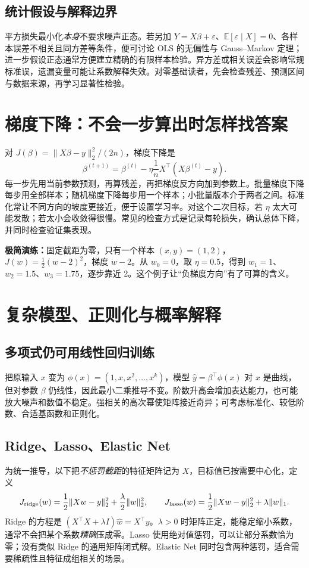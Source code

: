\documentclass[UTF8,11pt,oneside]{ctexbook}
\newcommand{\E}{\mathbb{E}}
\begin{document}
\section{统计假设与解释边界}
平方损失最小化\emph{本身}不要求噪声正态。若另加 $Y=X\beta+\varepsilon$、$\E[\varepsilon\mid X]=0$、各样本误差不相关且同方差等条件，便可讨论 OLS 的无偏性与 Gauss--Markov 定理；进一步假设正态通常方便建立精确的有限样本检验。异方差或相关误差会影响常规标准误，遗漏变量可能让系数解释失效。对零基础读者，先会检查残差、预测区间与数据来源，再学习显著性检验。

\chapter{梯度下降：不会一步算出时怎样找答案}
对 $J(\beta)=\|X\beta-y\|_2^2/(2n)$，梯度下降是
\[
\beta^{(t+1)}=\beta^{(t)}-\eta\frac1nX^\top(X\beta^{(t)}-y).
\]
每一步先用当前参数预测，再算残差，再把梯度反方向加到参数上。批量梯度下降每步用全部样本；随机梯度下降每步用一个样本；小批量版本介于两者之间。标准化常让不同方向的坡度更接近，便于设置学习率。对这个二次目标，若 $\eta$ 太大可能发散；若太小会收敛得很慢。常见的检查方式是记录每轮损失，确认总体下降，并同时检查验证集表现。

\textbf{极简演练：}固定截距为零，只有一个样本 $(x,y)=(1,2)$，$J(w)=\frac12(w-2)^2$，梯度 $w-2$。从 $w_0=0$，取 $\eta=0.5$，得到 $w_1=1$、$w_2=1.5$、$w_3=1.75$，逐步靠近 2。这个例子让“负梯度方向”有了可算的含义。

\chapter{复杂模型、正则化与概率解释}
\section{多项式仍可用线性回归训练}
把原输入 $x$ 变为 $\phi(x)=(1,x,x^2,\ldots,x^k)$，模型 $\hat y=\beta^\top\phi(x)$ 对 $x$ 是曲线，但对参数 $\beta$ 仍线性，因此最小二乘推导不变。阶数升高会增加表达能力，也可能放大噪声和数值不稳定。强相关的高次幂使矩阵接近奇异；可考虑标准化、较低阶数、合适基函数和正则化。

\section{Ridge、Lasso、Elastic Net}
为统一推导，以下把\emph{不惩罚截距}的特征矩阵记为 $X$，目标值已按需要中心化，定义
\[
J_{\rm ridge}(w)=\frac12\|Xw-y\|_2^2+\frac\lambda2\|w\|_2^2,
\qquad
J_{\rm lasso}(w)=\frac12\|Xw-y\|_2^2+\lambda\|w\|_1.
\]
Ridge 的方程是 $(X^\top X+\lambda I)\hat w=X^\top y$。$\lambda>0$ 时矩阵正定，能稳定缩小系数，通常不会把某个系数\emph{精确}压成零。Lasso 使用绝对值惩罚，可以让部分系数恰为零；没有类似 Ridge 的通用矩阵闭式解。Elastic Net 同时包含两种惩罚，适合需要稀疏性且特征成组相关的场景。
\end{document}
